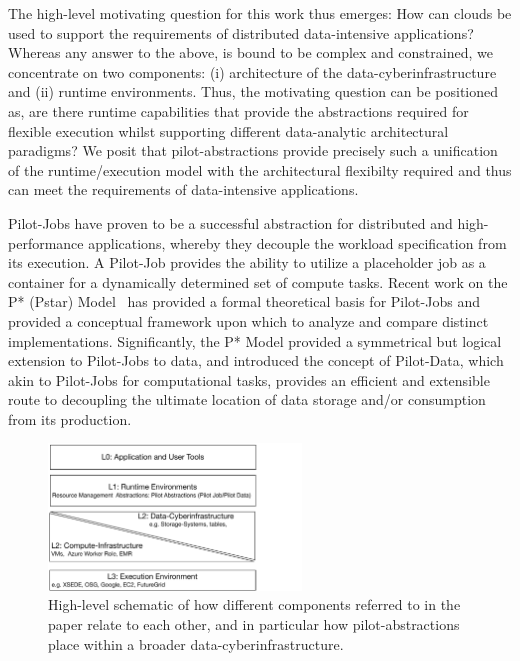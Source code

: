 \documentclass[times]{cpeauth}
\newcommand{\pilotjob}{Pilot-Job\xspace}
\newcommand{\pilotjobs}{Pilot-Jobs\xspace}
\begin{document}


The high-level motivating question for this work thus emerges: How can
clouds be used to support the requirements of distributed
data-intensive applications?  Whereas any answer to the above, is
bound to be complex and constrained, we concentrate on two components:
(i) architecture of the data-cyberinfrastructure and (ii) runtime
environments. Thus, the motivating question can be positioned as, are
there runtime capabilities that provide the abstractions required for
flexible execution whilst supporting different data-analytic
architectural paradigms?  We posit that pilot-abstractions provide
precisely such a unification of the runtime/execution model with the
architectural flexibilty required and thus can meet the requirements
of data-intensive applications.


\pilotjobs have proven to be a successful abstraction for distributed
and high-performance applications, whereby they decouple the workload
specification from its execution. A \pilotjob provides the ability to
utilize a placeholder job as a container for a dynamically determined
set of compute tasks. Recent work on the P* (Pstar)
Model~\cite{pstar12} has provided a formal theoretical basis for
Pilot-Jobs and provided a conceptual framework upon which to analyze
and compare distinct implementations. Significantly, the P* Model
provided a symmetrical but logical extension to Pilot-Jobs to data,
and introduced the concept of Pilot-Data, which akin to Pilot-Jobs for
computational tasks, provides an efficient and extensible route to
decoupling the ultimate location of data storage and/or consumption
from its production.  
\begin{figure}[t] \centering
\includegraphics[width=0.6\textwidth]{figures/data-intensive-arch.pdf}
\caption{High-level schematic of how different components referred to
  in the paper relate to each other, and in particular how
  pilot-abstractions place within a broader data-cyberinfrastructure.}
\label{fig:figures_arch}
\end{figure}
\end{document}
